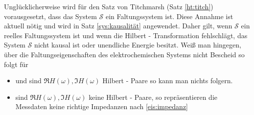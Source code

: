                                                                                                                                                                                                                                                                                                                                                                                                                                                                                                                                                                                                            Unglücklicherweise wird für den Satz von Titchmarsh (Satz \ref{ht:titch}) vorausgesetzt, dass das System $\mathscr{S}$ ein Faltungssystem ist. Diese Annahme ist aktuell nötig und wird in Satz \ref{sys:kausalität} angewendet.	Daher gilt, wenn $\mathscr{S}$ ein reelles Faltungssystem ist und wenn die Hilbert - Transformation fehlschlägt, das System $\mathscr{S}$ nicht kausal ist oder unendliche Energie besitzt. Weiß man hingegen, über die Faltungseigenschaften des elektrochemischen Systems nicht Bescheid so folgt für
                                                                                                                                                                                                                                                                                                      \begin{itemize}
                                                                                                                                                                                                                                                                                                     \item und sind $\Re{H(\omega)}, \Im{H(\omega)}$ Hilbert - Paare so kann man nichts folgern.
                                                                                                                                                                                                                                                                                                     \item sind $\Re{H(\omega)}, \Im{H(\omega)}$ keine Hilbert - Paare, so repräsentieren die Messdaten keine richtige Impedanzen nach \ref{eis:impedanz}
\end{itemize}                                                                                                                                                                                                                                                                                                        

